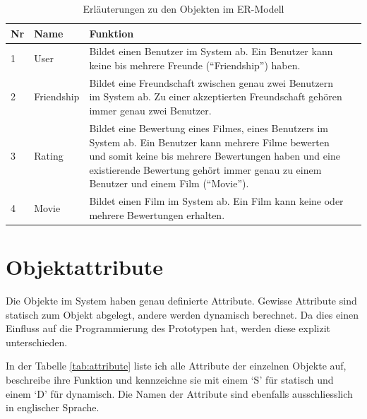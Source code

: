 \begin{table}[ht]
\begin{center}
    \begin{tabular}{llp{10cm}l}
        \toprule Nr & Name & Funktion \\
        \midrule 1 & User & Bildet einen Benutzer im System ab. Ein Benutzer
                     kann keine bis mehrere Freunde (``Friendship'') haben. \\
        \midrule 2 & Friendship & Bildet eine Freundschaft zwischen genau zwei
                     Benutzern im System ab. Zu einer akzeptierten Freundschaft 
                     gehören immer genau zwei Benutzer. \\
        \midrule 3 & Rating & Bildet eine Bewertung eines Filmes, eines Benutzers
                     im System ab. Ein Benutzer kann mehrere Filme bewerten und
                     somit keine bis mehrere Bewertungen haben und eine 
                     existierende Bewertung gehört immer genau zu einem Benutzer 
                     und einem Film (``Movie''). \\
        \midrule 4 & Movie & Bildet einen Film im System ab. Ein Film kann keine
                     oder mehrere Bewertungen erhalten. \\
        \bottomrule
    \end{tabular}
    \caption{Erläuterungen zu den Objekten im ER-Modell}
    \label{tab:erm}
\end{center}
\end{table}

\clearpage

\section{Objektattribute}
Die Objekte im System haben genau definierte Attribute. Gewisse Attribute sind
statisch zum Objekt abgelegt, andere werden dynamisch berechnet. Da dies einen
Einfluss auf die Programmierung des Prototypen hat, werden diese explizit 
unterschieden.

In der Tabelle \ref{tab:attribute} liste ich alle Attribute
der einzelnen Objekte auf, beschreibe ihre Funktion und kennzeichne sie mit
einem `S' für statisch und einem `D' für dynamisch. Die Namen der Attribute sind 
ebenfalls ausschliesslich in englischer Sprache.

